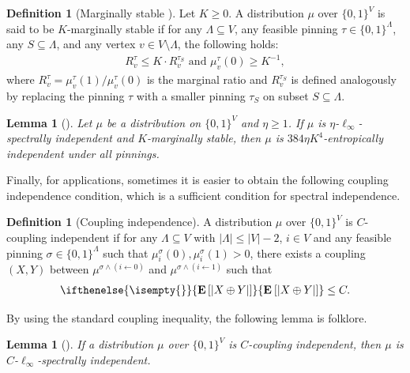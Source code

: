 \documentclass[11pt,a4paper]{article}
\newtheorem{lemma}[theorem]{Lemma}
\theoremstyle{definition}
\newtheorem{definition}[theorem]{Definition}
\newcommand{\abs}[1]{\left\vert#1\right\vert}
\newcommand{\E}[2][]{ \ifthenelse{\isempty{#1}}
  {\mathbf{\mathbf{E}}\left[#2\right]}
  {\mathbf{\mathbf{E}}_{#1}\left[#2\right]} }
\begin{document}
\begin{definition}[Marginally stable \cite{CFYZ22,ChenE22}]
Let $K \geq 0$. A distribution $\mu$ over $\{0,1\}^V$ is said to be $K$-marginally stable if for any $\Lambda \subseteq V$, any feasible pinning $\tau \in \{0,1\}^{\Lambda}$, any $S \subseteq \Lambda$, and any vertex $v \in V \setminus \Lambda$, the following holds:
\begin{align*}
 R^\tau_v \leq K \cdot R^{\tau_S}_v \text{ and } \mu^\tau_v(0) \geq K^{-1},
\end{align*}
where $R^{\tau}_v = {\mu^\tau_v(1)}/{\mu^\tau_v(0)}$ is the marginal ratio and $R^{\tau_S}_v$ is defined analogously by replacing the pinning $\tau$ with a smaller pinning $\tau_S$ on subset $S \subseteq \Lambda$.
\end{definition}

\begin{lemma}[]\label{lem:SIandMStoEI}
Let $\mu$ be a distribution on $\{0,1\}^V$ and $\eta\geq 1$. If $\mu$ is $\eta$-$\ell_\infty$-spectrally independent and $K$-marginally stable, then $\mu$ is $384\eta K^4$-entropically independent under all pinnings. 
\end{lemma} %

Finally, for applications, sometimes it is easier to obtain the following coupling independence condition, which is a sufficient condition for spectral independence.


\begin{definition}[Coupling independence]
    A distribution $\mu$ over $\{0,1\}^V$ is $C$-coupling independent if for any $\Lambda\subseteq V$ with $|\Lambda|\leq |V|-2$, $i\in V$ and any feasible pinning $\sigma\in \{0,1\}^\Lambda$ such that $\mu^{\sigma}_i(0),\mu^{\sigma}_i(1)>0$, there exists a coupling $(X,Y)$ between $\mu^{\sigma\land (i\gets 0)}$ and $\mu^{\sigma\land (i\gets 1)}$ such that 
    \begin{align*}
        \E[]{\abs{X\oplus Y}}\leq C.
    \end{align*}
\end{definition}

By using the standard coupling inequality, the following lemma is folklore.

\begin{lemma}[]\label{lem:CI-SI}
If a distribution $\mu$ over $\{0,1\}^V$ is $C$-coupling independent, then $\mu$ is $C$-$\ell_\infty$-spectrally independent.
\end{lemma}
\end{document}
